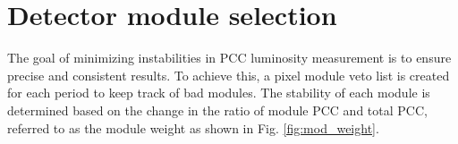 \section{Detector module selection}

The goal of minimizing instabilities in PCC luminosity measurement is to ensure precise and consistent results. To achieve this, a pixel module veto list is created for each period to keep track of  bad modules. The stability of each module is determined based on the change in the ratio of module PCC and total PCC, referred to as the module weight as shown in Fig. \ref{fig:mod_weight}.






